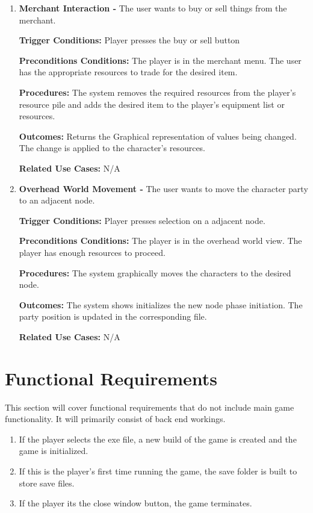 \documentclass{article}
\begin{document}
\begin{enumerate}[{PUC}1. ]
	\item \textbf{Merchant Interaction -} The user wants to buy or sell things from the merchant. \par
\textbf{Trigger Conditions: }Player presses the buy or sell button \par
\textbf{Preconditions Conditions: }The player is in the merchant menu. The user has the appropriate resources to trade for the desired item.\par
\textbf{Procedures: }The system removes the required resources from the player's resource pile and adds the desired item to the player's equipment list or resources. \par
\textbf{Outcomes: }Returns the Graphical representation of values being changed. The change is applied to the character's resources. \par
\textbf{Related Use Cases: }N/A \par

	\item \textbf{Overhead World Movement -} The user wants to move the character party to an adjacent node. \par
\textbf{Trigger Conditions: }Player presses selection on a adjacent node. \par
\textbf{Preconditions Conditions: }The player is in the overhead world view. The player has enough resources to proceed.\par
\textbf{Procedures: }The system graphically moves the characters to the desired node. \par
\textbf{Outcomes: }The system shows initializes the new node phase initiation. The party position is updated in the corresponding file. \par
\textbf{Related Use Cases: }N/A \par
\end{enumerate}
\section{Functional Requirements}
\quad This section will cover functional requirements that do not include main game functionality. It will primarily consist of back end workings.
\begin{enumerate}[{FR}1. ]
	\item If the player selects the exe file, a new build of the game is created and the game is initialized.
	\item If this is the player's first time running the game, the save folder is built to store save files.
	\item If the player its the close window button, the game terminates.
\end{enumerate}
\end{document}
